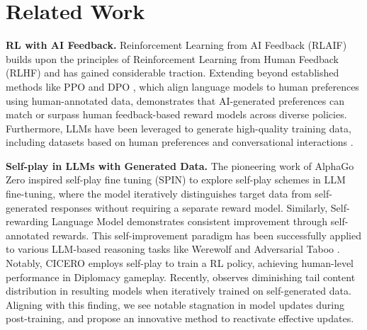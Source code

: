 \section{Related Work}
\textbf{RL with AI Feedback.} Reinforcement Learning from AI Feedback (RLAIF) \citep{bai2022traininghelpfulharmlessassistant} builds upon the principles of Reinforcement Learning from Human Feedback (RLHF) \citep{ouyang2022traininglanguagemodelsfollow, christiano2023deepreinforcementlearninghuman} and has gained considerable traction. Extending beyond established methods like PPO \citep{schulman2017proximalpolicyoptimizationalgorithms} and DPO \citep{rafailov2024directpreferenceoptimizationlanguage}, which align language models to human preferences using human-annotated data, \citep{lee2024rlaifvsrlhfscaling} demonstrates that AI-generated preferences can match or surpass human feedback-based reward models across diverse policies. Furthermore, LLMs have been leveraged to generate high-quality training data, including datasets based on human preferences \citep{cui2024ultrafeedbackboostinglanguagemodels} and conversational interactions \citep{ding2023enhancingchatlanguagemodels}.


\textbf{Self-play in LLMs with Generated Data.} 
The pioneering work of AlphaGo Zero \citep{silver2017mastering} inspired self-play fine tuning (SPIN) \citep{chen2024selfplayfinetuningconvertsweak} to explore self-play schemes in LLM fine-tuning, where the model iteratively distinguishes target data from self-generated responses without requiring a separate reward model. Similarly, Self-rewarding Language Model \citep{yuan2024selfrewardinglanguagemodels} demonstrates consistent improvement through self-annotated rewards. This self-improvement paradigm has been successfully applied to various LLM-based reasoning tasks like Werewolf \citep{xu2024languageagentsreinforcementlearning} and Adversarial Taboo \citep{cheng2024selfplayingadversariallanguagegame}. Notably, CICERO \citep{meta2022human} employs self-play to train a RL policy, achieving human-level performance in Diplomacy gameplay. Recently, \citep{shumailov2024ai} observes diminishing tail content distribution in resulting models when iteratively trained on self-generated data. Aligning with this finding, we see notable stagnation in model updates during post-training, and propose an innovative method to reactivate effective updates.



